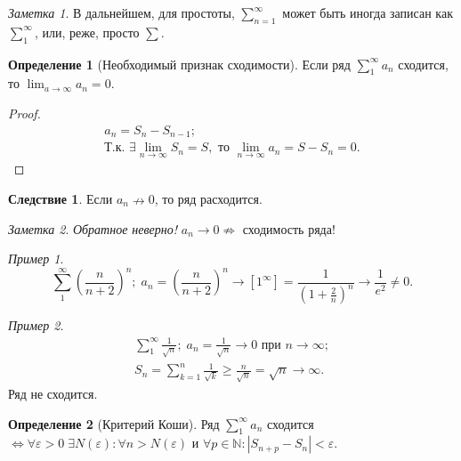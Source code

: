 \documentclass[a4paper,12pt]{article}
\theoremstyle{remark}
\newtheorem*{note}{Заметка}
\newtheorem*{example}{Пример}
\theoremstyle{definition}
\newtheorem{definition}{Определение}
\newtheorem*{effect}{Следствие}
\begin{document}
\begin{note}
    В дальнейшем, для простоты, \(\sum_{n=1}^{\infty}\) может быть иногда записан как \(\sum_{1}^{\infty}\), или, реже, просто \(\sum\).
\end{note}


\begin{definition}[Необходимый признак сходимости]
    Если ряд \(\sum^{\infty}_{1} a_n\) сходится, то \(\lim_{a \rightarrow \infty} a_n = 0\).
\end{definition}

\begin{proof}
    \begin{gather*}
        a_n = S_n - S_{n - 1}; \\
        \text{Т.к. } \exists \lim_{n \rightarrow \infty} S_n = S, \text{ то } \lim_{n \rightarrow \infty} a_n = S - S_n = 0.
    \end{gather*}
\end{proof}

\begin{effect}
    Если \(a_n \nrightarrow 0\), то ряд расходится. 
\end{effect}

\begin{note}
    \emph{Обратное неверно!} \(a_n \rightarrow 0 \nRightarrow\) сходимость ряда!
\end{note}

\begin{example}
    \begin{equation*}
        \sum^{\infty}_{1} \left(\frac{n}{n+2}\right)^{n} \!;\; a_n = \left(\frac{n}{n+2}\right)^{n} \rightarrow \left[1^\infty\right] = \frac{1}{\left(1 + \frac{2}{n}\right)^n} \rightarrow \frac{1}{e^2} \neq 0.
    \end{equation*}
\end{example}

\begin{example}
    \begin{gather*}
        \sum^{\infty}_{1} \frac{1}{\sqrt{n}};\; a_n = \frac{1}{\sqrt{n}} \rightarrow 0 \text{ при } n \rightarrow \infty; \\
        S_n = \sum^n_{k=1} \frac{1}{\sqrt{k}} \geqslant \frac{n}{\sqrt{n}} = \sqrt{n} \rightarrow \infty.
    \end{gather*}
    Ряд не сходится.
\end{example}

\begin{definition}[Критерий Коши]
    Ряд \(\sum_1^\infty a_n\) сходится \(\Leftrightarrow \forall \varepsilon > 0\; \exists N(\varepsilon): \forall n > N(\varepsilon) \text{ и } \forall p \in \mathbb{N}: |S_{n + p} - S_n| < \varepsilon\).
\end{definition}
\end{document}
